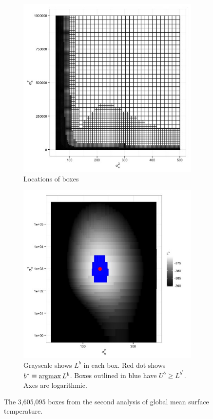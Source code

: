 \documentclass{report}
\newcommand{\argmax}{\operatornamewithlimits{argmax}}
\begin{document}
\begin{figure}
  \begin{subfigure}{.5\textwidth}
    \centering
    \includegraphics[width=.8\linewidth]{figs/gmst-boxes2.jpg}
    \caption{Locations of boxes}
    \label{fig:gmst-boxes2}
  \end{subfigure}
  \begin{subfigure}{.5\textwidth}
    \centering
    \includegraphics[width=.8\linewidth]{figs/gmst-rll2.jpg}
    \caption{Grayscale shows $L^b$ in each box.
                  Red dot shows $b^* \equiv\argmax L^b$.
	          Boxes outlined in blue have $U^b \ge L^{b^*}$.
	          Axes are logarithmic.}
    \label{fig:gmstrll2}
  \end{subfigure}
  \caption{The 3,605,095 boxes from the second analysis of global
                mean surface temperature.}
\label{fig:gmst2}
\end{figure}
\end{document}
